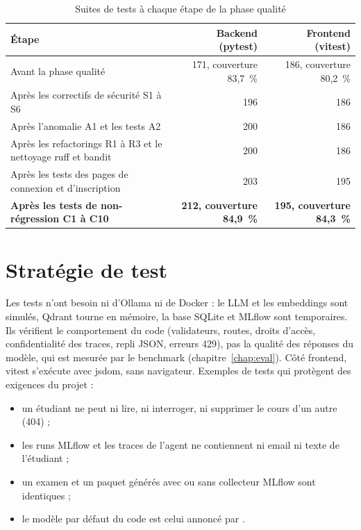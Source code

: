 \documentclass[12pt,a4paper]{report}
\DeclareRobustCommand{\code}[1]{\texttt{\codecasse{#1}}}
\begin{document}
\begin{table}[htbp]
\centering
\caption{Suites de tests à chaque étape de la phase qualité}
\label{tab:etapes-qualite}
\begin{tabularx}{\textwidth}{@{}Lrr@{}}
\toprule
\textbf{Étape} & \textbf{Backend (pytest)} & \textbf{Frontend (vitest)} \\
\midrule
Avant la phase qualité & 171, couverture 83,7~\% & 186, couverture 80,2~\% \\
Après les correctifs de sécurité S1 à S6 & 196 & 186 \\
Après l'anomalie A1 et les tests A2 & 200 & 186 \\
Après les refactorings R1 à R3 et le nettoyage ruff et bandit & 200 & 186 \\
Après les tests des pages de connexion et d'inscription & 203 & 195 \\
\textbf{Après les tests de non-régression C1 à C10} & \textbf{212, couverture 84,9~\%} & \textbf{195, couverture 84,3~\%} \\
\bottomrule
\end{tabularx}
\end{table}

\section{Stratégie de test}

Les tests n'ont besoin ni d'Ollama ni de Docker : le LLM et les embeddings sont simulés, Qdrant tourne en
mémoire, la base SQLite et MLflow sont temporaires. Ils vérifient le comportement du code (validateurs,
routes, droits d'accès, confidentialité des traces, repli JSON, erreurs 429), pas la qualité des réponses
du modèle, qui est mesurée par le benchmark (chapitre~\ref{chap:eval}). Côté frontend, vitest s'exécute
avec jsdom, sans navigateur. Exemples de tests qui protègent des exigences du projet :
\begin{itemize}
  \item un étudiant ne peut ni lire, ni interroger, ni supprimer le cours d'un autre (404) ;
  \item les runs MLflow et les traces de l'agent ne contiennent ni email ni texte de l'étudiant ;
  \item un examen et un paquet générés avec ou sans collecteur MLflow sont identiques ;
  \item le modèle par défaut du code est celui annoncé par \code{.env.example}.
\end{itemize}
\end{document}
